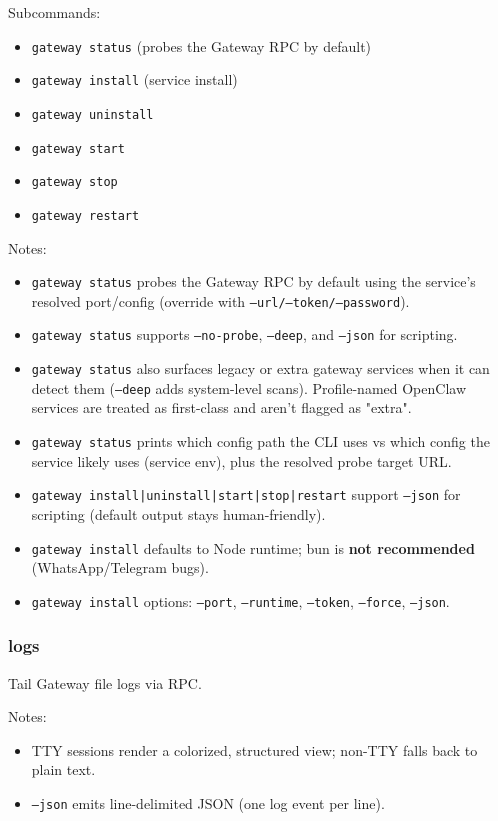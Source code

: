 Subcommands:

\begin{itemize}
  \item \texttt{gateway status} (probes the Gateway RPC by default)
  \item \texttt{gateway install} (service install)
  \item \texttt{gateway uninstall}
  \item \texttt{gateway start}
  \item \texttt{gateway stop}
  \item \texttt{gateway restart}
\end{itemize}


Notes:

\begin{itemize}
  \item \texttt{gateway status} probes the Gateway RPC by default using the service’s resolved port/config (override with \texttt{--url/--token/--password}).
  \item \texttt{gateway status} supports \texttt{--no-probe}, \texttt{--deep}, and \texttt{--json} for scripting.
  \item \texttt{gateway status} also surfaces legacy or extra gateway services when it can detect them (\texttt{--deep} adds system-level scans). Profile-named OpenClaw services are treated as first-class and aren't flagged as "extra".
  \item \texttt{gateway status} prints which config path the CLI uses vs which config the service likely uses (service env), plus the resolved probe target URL.
  \item \texttt{gateway install|uninstall|start|stop|restart} support \texttt{--json} for scripting (default output stays human-friendly).
  \item \texttt{gateway install} defaults to Node runtime; bun is \textbf{not recommended} (WhatsApp/Telegram bugs).
  \item \texttt{gateway install} options: \texttt{--port}, \texttt{--runtime}, \texttt{--token}, \texttt{--force}, \texttt{--json}.
\end{itemize}


\subsubsection{logs}


Tail Gateway file logs via RPC.

Notes:

\begin{itemize}
  \item TTY sessions render a colorized, structured view; non-TTY falls back to plain text.
  \item \texttt{--json} emits line-delimited JSON (one log event per line).
\end{itemize}


